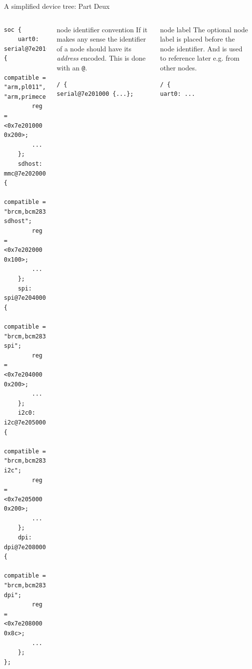 \documentclass[aspectratio=169]{beamer}
\newcommand{\sectiontitle}{}
\begin{document}
\begin{frame}[fragile]{A simplified device tree: Part Deux}{\sectiontitle}
\begin{columns}[T]
\begin{verbatim}
soc {
	uart0: serial@7e201000 {
		compatible = "arm,pl011", "arm,primecell";
		reg = <0x7e201000 0x200>;
		...
	};
	sdhost: mmc@7e202000 {
		compatible = "brcm,bcm2835-sdhost";
		reg = <0x7e202000 0x100>;
		...
	};
	spi: spi@7e204000 {
		compatible = "brcm,bcm2835-spi";
		reg = <0x7e204000 0x200>;
		...
	};
	i2c0: i2c@7e205000 {
		compatible = "brcm,bcm2835-i2c";
		reg = <0x7e205000 0x200>;
		...
	};
	dpi: dpi@7e208000 {
		compatible = "brcm,bcm2835-dpi";
		reg = <0x7e208000 0x8c>;
		...
	};
};
\end{verbatim}
\begin{block}{node identifier convention}
If it makes any sense the identifier of a node should have its \emph{address}
encoded. This is done with an \verb|@|.
\begin{verbatim}
/ {
serial@7e201000 {...};
\end{verbatim}
\end{block}
\begin{block}{node label}
The optional node label is placed before the node identifier. And is used to reference later e.g. from other nodes.
\begin{verbatim}
/ {
uart0: ...
\end{verbatim}
\end{block}
\end{columns}
\end{frame}
\end{document}
